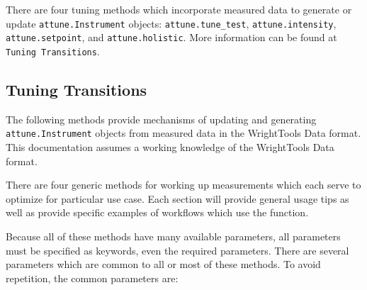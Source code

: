 There are four tuning methods which incorporate measured data to
generate or update \texttt{attune.Instrument} objects:
\texttt{attune.tune\_test}, \texttt{attune.intensity},
\texttt{attune.setpoint}, and \texttt{attune.holistic}. More information
can be found at \texttt{Tuning\ Transitions}.

\hypertarget{tuningux20transitions}{%
\subsection{Tuning Transitions}\label{tuningux20transitions}}

The following methods provide mechanisms of updating and generating
\texttt{attune.Instrument} objects from measured data in the
WrightTools Data
format. This documentation assumes a working knowledge of the
WrightTools Data format.

There are four generic methods for working up measurements which each
serve to optimize for particular use case. Each section will provide
general usage tips as well as provide specific examples of workflows
which use the function.

Because all of these methods have many available parameters, all
parameters must be specified as keywords, even the required parameters.
There are several parameters which are common to all or most of these
methods. To avoid repetition, the common parameters are:

